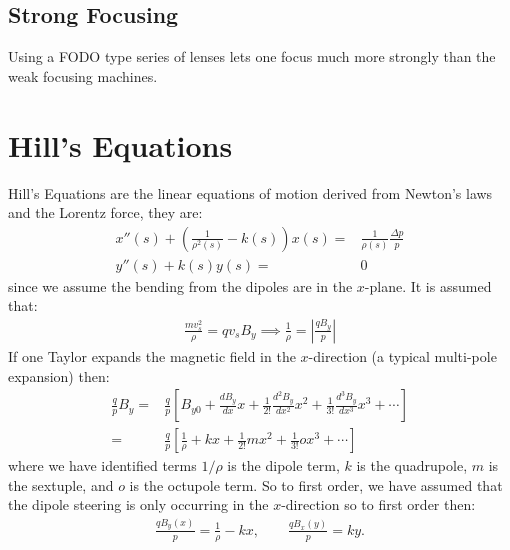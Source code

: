 \documentclass{article}
\numberwithin{equation}{section}
\begin{document}
\subsection{Strong Focusing}
Using a FODO type series of lenses lets one focus much more strongly than the weak focusing machines. 

\section{Hill's Equations}
Hill's Equations are the linear equations of motion derived from Newton's laws and the Lorentz force, they are:
\begin{align}
x''(s) + \left( \frac{1}{\rho^2(s)} -k(s) \right) x(s) =& \frac{1}{\rho(s)}\frac{\Delta p}{p} \\
y''(s) + k(s) y(s) =& 0
\end{align}
since we assume the bending from the dipoles are in the $x$-plane. It is assumed that: 
\begin{align}
\frac{m v_s^2}{\rho} = qv_s B_y \implies \frac{1}{\rho} = \left| \frac{q B_y}{p} \right|
\end{align}
If one Taylor expands the magnetic field in the $x$-direction (a typical multi-pole expansion) then:
\begin{align}
\frac{q}{p} B_y =& \frac{q}{p} \left[ B_{y0} + \frac{dB_y}{dx} x + \frac{1}{2!}\frac{d^2 B_y}{dx^2} x^2 + \frac{1}{3!}\frac{d^3 B_y}{dx^3} x^3 + \cdots \right] \\
=& \frac{q}{p} \left[ \frac{1}{\rho} + k x + \frac{1}{2!} m x^2 + \frac{1}{3!} o x^3 + \cdots \right]
\end{align}
where we have identified terms $1/\rho$ is the dipole term, $k$ is the quadrupole, $m$ is the sextuple, and $o$ is the octupole term. So to first order, we have assumed that the dipole steering is only occurring in the $x$-direction so to first order then:
\begin{align}
\frac{qB_y(x)}{p} = \frac{1}{\rho} - kx ,\qquad \frac{qB_x(y)}{p} = ky .
\end{align}
\end{document}
